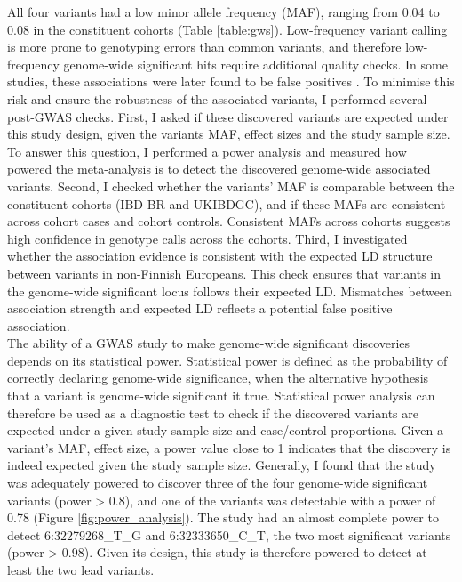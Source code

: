   

  All four variants had a low minor allele frequency (MAF), ranging from  0.04 to 0.08 in the constituent cohorts (Table \ref{table:gws}). Low-frequency variant calling is more prone to genotyping errors than common variants, and therefore low-frequency genome-wide significant hits require additional quality checks. In some studies, these associations were later found to be false positives \cite{Tabangin2009-gs,Ayers2011-bc}. To minimise this risk and ensure the robustness of the associated variants, I performed several post-GWAS checks. First, I asked if these discovered variants are expected under this study design, given the variants MAF, effect sizes and the study sample size. To answer this question, I performed a power analysis and measured how powered the meta-analysis is to detect the discovered genome-wide associated variants. Second, I checked whether the variants' MAF is comparable between the constituent cohorts (IBD-BR and UKIBDGC), and if these MAFs are consistent across cohort cases and cohort controls. Consistent MAFs across cohorts suggests high confidence in genotype calls across the cohorts. Third, I investigated whether the association evidence is consistent with the expected LD structure between variants in non-Finnish Europeans. This check ensures that variants in the genome-wide significant locus follows their expected LD. Mismatches between association strength and expected LD reflects a potential false positive association.\\


  The ability of a GWAS study to make genome-wide significant discoveries depends on its statistical power. Statistical power is defined as the probability of correctly declaring genome-wide significance, when the alternative hypothesis that a variant is genome-wide significant it true. Statistical power analysis can therefore be used as a diagnostic test to check if the discovered variants are expected under a given study sample size and case/control proportions. Given a variant's MAF, effect size, a power value close to 1 indicates that the discovery is indeed expected given the study sample size. Generally, I found that the study was adequately powered to discover three of the four genome-wide significant variants (power > 0.8), and one of the variants was detectable with a power of 0.78 (Figure \ref{fig:power_analysis}). The study had an almost complete power to detect 6:32279268\_T\_G and 6:32333650\_C\_T, the two most significant variants (power > 0.98). Given its design, this study is therefore powered to detect at least the two lead variants.

